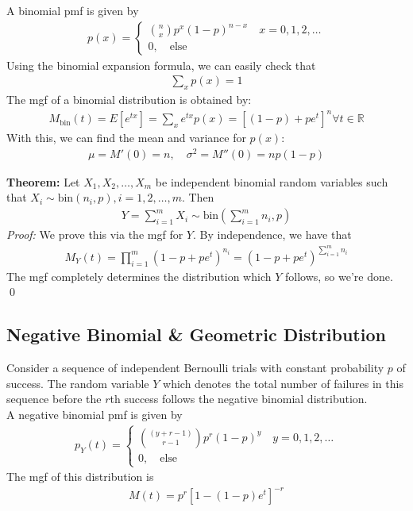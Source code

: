 \documentclass{book}
\theoremstyle{definition}
\newcommand{\R}{\mathbb{R}}
\newcommand{\lp}{\left(}
\newcommand{\rp}{\right)}
\newcommand{\lb}{\left[}
\newcommand{\rb}{\right]}
\begin{document}
A binomial pmf is given by
\begin{align}
\boxed{p(x) = \begin{cases}
{n\choose x}p^x(1-p)^{n-x} \quad x=0,1,2,\dots \\
0, \quad \text{else}
\end{cases}}
\end{align}
Using the binomial expansion formula, we can easily check that
\begin{align}
\boxed{\sum_x p(x) = 1}
\end{align}
The mgf of a binomial distribution is obtained by:
\begin{align}
\boxed{M_{\text{bin}}(t) = E[e^{tx}] = \sum_x e^{tx}p(x) = \lb (1-p) + pe^t \rb^n \forall t \in \R}
\end{align}
With this, we can find the mean and variance for $p(x)$:
\begin{align}
\boxed{\mu = M'(0) = n, \quad \sigma^2 = M''(0) = np(1-p)}
\end{align}

\noindent \textbf{Theorem:} Let $X_1, X_2, \dots, X_m$ be independent binomial random variables such that $X_i \sim \text{bin}(n_i, p), i = 1,2,\dots,m$. Then 
\begin{align}
\boxed{Y = \sum^m_{i=1} X_i \sim \text{bin}\lp \sum^m_{i=1}n_i, p \rp}
\end{align}
\noindent \textit{Proof:} We prove this via the mgf for $Y$. By independence, we have that
\begin{align}
M_Y(t) = \prod^m_{i=1}(1-p + pe^t)^{n_i} = (1-p + pe^t)^{\sum^m_{i=1} n_i}
\end{align}
The mgf completely determines the distribution which $Y$ follows, so we're done. \qed



\subsection{Negative Binomial \& Geometric Distribution}
Consider a sequence of independent Bernoulli trials with constant probability $p$ of success. The random variable $Y$ which denotes the total number of failures in this sequence before the $r$th success follows the negative binomial distribution.\\


A negative binomial pmf is given by
\begin{align}
\boxed{p_Y(t) = \begin{cases}
{(y+r-1)\choose{r-1}}p^r(1-p)^y \quad y = 0,1,2,\dots\\
0, \quad \text{else}
\end{cases}}
\end{align} 
The mgf of this distribution is 
\begin{align}
\boxed{M(t) = p^r[1-(1-p)e^{t}]^{-r}}
\end{align}
 
\end{document}
